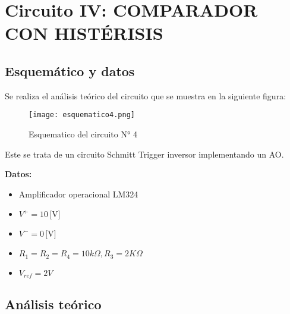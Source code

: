 %
 \section{Circuito IV: COMPARADOR CON HISTÉRISIS}

\subsection{Esquemático y datos}

Se realiza el análisis teórico del circuito que se muestra en la siguiente figura: 
 \vspace{1em}

  \begin{figure}[h!]
     \centering
	 \texttt{[image: esquematico4.png]}
	 \caption{Esquematico del circuito N° 4}
	 \label{fig:esquematico4}
  \end{figure}
  
  \vspace{1em}
Este se trata de un circuito Schmitt Trigger inversor implementando un AO.

\textbf{Datos:}

\begin{itemize}
  \item Amplificador operacional LM324
  \item $V^+ = 10 \, \text{[V]}$
  \item $V^- = 0 \, \text{[V]}$
  \item $R_1 = R_2 = R_4 = 10k\Omega , R_3 = 2K\Omega$
  \item $V_{ref} = 2V $
\end{itemize}

\vspace{1em}

\subsection{Análisis teórico}

